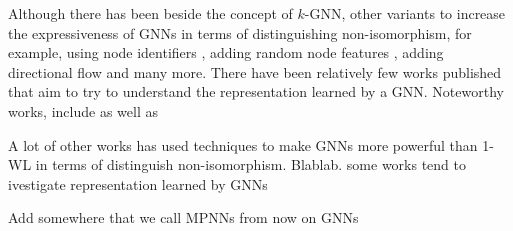 Although there has been beside the concept of $k$-GNN, other variants to increase the expressiveness of GNNs in terms of distinguishing non-isomorphism, for example, using node identifiers \cite{Vignac2020}, adding random node features \cite{Sato2021,Abboud2020}, adding directional flow \cite{Beaini2021} and many more. There have been relatively few works published that aim to try to understand the representation learned by a GNN. Noteworthy works, include \cite{Nikolentzos2023} as well as \cite{Nikolentzos2023weisfeiler}


A lot of other works has used techniques to make GNNs more powerful than 1-WL in terms of distinguish non-isomorphism.  Blablab. some works tend to ivestigate representation learned by GNNs

Add somewhere that we call MPNNs from now on GNNs